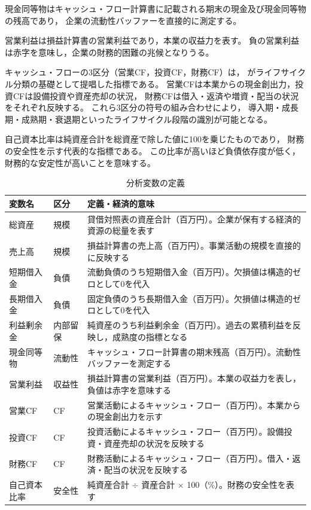 現金同等物はキャッシュ・フロー計算書に記載される期末の現金及び現金同等物の残高であり，
企業の流動性バッファーを直接的に測定する。

営業利益は損益計算書の営業利益であり，本業の収益力を表す。
負の営業利益は赤字を意味し，企業の財務的困難の兆候となりうる。

キャッシュ・フローの3区分（営業CF，投資CF，財務CF）は，
がライフサイクル分類の基礎として提唱した指標である。
営業CFは本業からの現金創出力，投資CFは設備投資や資産売却の状況，
財務CFは借入・返済や増資・配当の状況をそれぞれ反映する。
これら3区分の符号の組み合わせにより，
導入期・成長期・成熟期・衰退期といったライフサイクル段階の識別が可能となる。

自己資本比率は純資産合計を総資産で除した値に100を乗じたものであり，
財務の安全性を示す代表的な指標である。
この比率が高いほど負債依存度が低く，財務的な安定性が高いことを意味する。

\begin{table}[htbp]
  \centering
  \caption{分析変数の定義}
  \label{tab:variables}
  \begin{tabularx}{\linewidth}{llX}
    \toprule
    変数名 & 区分 & 定義・経済的意味 \\
    \midrule
    総資産     & 規模  & 貸借対照表の資産合計（百万円）。企業が保有する経済的資源の総量を表す \\
    売上高     & 規模  & 損益計算書の売上高（百万円）。事業活動の規模を直接的に反映する \\
    短期借入金 & 負債  & 流動負債のうち短期借入金（百万円）。欠損値は構造的ゼロとして0を代入 \\
    長期借入金 & 負債  & 固定負債のうち長期借入金（百万円）。欠損値は構造的ゼロとして0を代入 \\
    利益剰余金 & 内部留保 & 純資産のうち利益剰余金（百万円）。過去の累積利益を反映し，成熟度の指標となる \\
    現金同等物 & 流動性 & キャッシュ・フロー計算書の期末残高（百万円）。流動性バッファーを測定する \\
    営業利益   & 収益性 & 損益計算書の営業利益（百万円）。本業の収益力を表し，負値は赤字を意味する \\
    営業CF    & CF    & 営業活動によるキャッシュ・フロー（百万円）。本業からの現金創出力を示す \\
    投資CF    & CF    & 投資活動によるキャッシュ・フロー（百万円）。設備投資・資産売却の状況を反映する \\
    財務CF    & CF    & 財務活動によるキャッシュ・フロー（百万円）。借入・返済・配当の状況を反映する \\
    自己資本比率 & 安全性 & 純資産合計 $\div$ 資産合計 $\times$ 100（\%）。財務の安全性を表す \\
    \bottomrule
  \end{tabularx}
\end{table}

